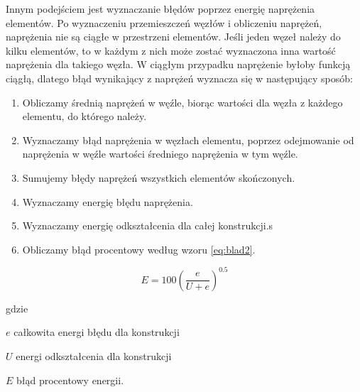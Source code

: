 \vspace{5mm}

Innym podejściem jest wyznaczanie błędów poprzez energię naprężenia elementów. Po wyznaczeniu przemieszczeń węzłów i obliczeniu naprężeń, naprężenia nie są ciągłe w przestrzeni elementów. Jeśli jeden węzeł należy do kilku elementów, to w każdym z nich może zostać wyznaczona inna wartość naprężenia dla takiego węzła. W ciągłym przypadku naprężenie byłoby funkcją ciągłą, dlatego błąd wynikający z naprężeń wyznacza się w następujący sposób:

\vspace{3mm}

\begin{enumerate}
	\item Obliczamy średnią naprężeń w węźle, biorąc wartości dla węzła z każdego elementu, do którego należy.
	\item Wyznaczamy błąd naprężenia w węzłach elementu, poprzez odejmowanie od naprężenia w węźle wartości średniego naprężenia w tym węźle.
	\item Sumujemy błędy naprężeń wszystkich elementów skończonych.
	\item Wyznaczamy energię błędu naprężenia.
	\item Wyznaczamy energię odkształcenia dla całej konstrukcji.s
	\item Obliczamy błąd procentowy według wzoru \ref{eq:blad2}.
\end{enumerate}

\vspace{3mm}

\begin{equation} \label{eq:blad2}
	E = 100(\frac{e}{U + e})^{0.5}
\end{equation}

gdzie
\begin{eqwhere}[2cm]
	\item[$ e $] całkowita energi błędu dla konstrukcji
	\item[$ U $] energi odkształcenia dla konstrukcji
	\item[$ E $] błąd procentowy energii.
\end{eqwhere}




















